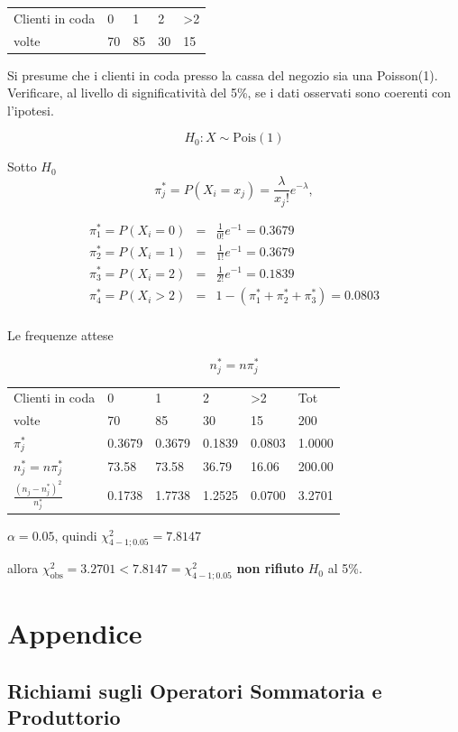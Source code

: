 \documentclass[
  11pt,
]{book}
\theoremstyle{mytheoremstyle}
\theoremstyle{mydefstyle}
\begin{document}
\begin{tabular}{lllll}
\toprule
Clienti in coda & 0 & 1 & 2 & >2\\
volte & 70 & 85 & 30 & 15\\
\bottomrule
\end{tabular}

Si presume che i clienti in coda presso la cassa del negozio sia una Poisson(1). Verificare, al livello di significatività del 5\%, se i dati osservati sono coerenti con l'ipotesi.

\[H_0:X\sim\text{Pois}(1)\]

Sotto \(H_0\)
\[\pi_j^*=P(X_i=x_j)=\frac \lambda{x_j!}e^{-\lambda},\]

\begin{eqnarray*}
   \pi_1^*=P(X_i=0)&=&\frac{1}{0!}e^{-1}=0.3679\\
   \pi_2^*=P(X_i=1)&=&\frac{1}{1!}e^{-1}=0.3679\\
   \pi_3^*=P(X_i=2)&=&\frac{1}{2!}e^{-1}=0.1839\\
   \pi_4^*=P(X_i>2)&=&1-(\pi_1^*+\pi_2^*+\pi_3^*)=0.0803\\
\end{eqnarray*}

Le frequenze attese

\[n_j^*=n\pi_j^*\]

\begin{tabular}{llllll}
\toprule
Clienti in coda & 0 & 1 & 2 & >2 & Tot\\
volte & 70 & 85 & 30 & 15 & 200\\
$\pi_j^*$ & 0.3679 & 0.3679 & 0.1839 & 0.0803 & 1.0000\\
$n_j^*=n\pi_j^*$ & 73.58 & 73.58 & 36.79 & 16.06 & 200.00\\
$\frac {(n_j-n_j^*)^2}{n_j^*}$ & 0.1738 & 1.7738 & 1.2525 & 0.0700 & 3.2701\\
\bottomrule
\end{tabular}

\(\alpha=0.05\), quindi \(\chi_{4-1;0.05}^2=7.8147\)

allora \(\chi^2_\text{obs}=3.2701<7.8147=\chi_{4-1;0.05}^2\)
\textbf{non rifiuto} \(H_0\) al 5\%.

\part{Appendice}

\appendix


\chapter{Richiami sugli Operatori Sommatoria e Produttorio}\label{richiami-sugli-operatori-sommatoria-e-produttorio}
\end{document}
